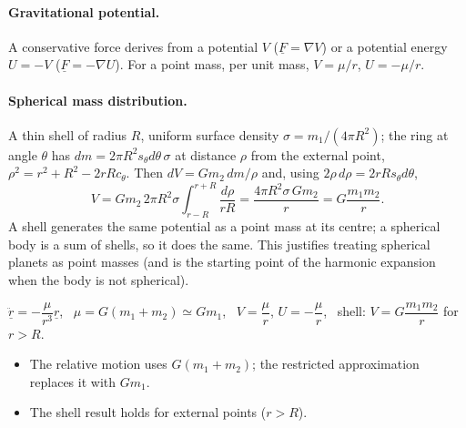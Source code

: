 \paragraph{Gravitational potential.} A conservative force derives from a potential $V$ ($\underline F=\nabla V$) or a potential energy $U=-V$
($\underline F=-\nabla U$). For a point mass, per unit mass, $V=\mu/r$, $U=-\mu/r$.

\paragraph{Spherical mass distribution.} A thin shell of radius $R$, uniform surface density $\sigma=m_1/(4\pi R^2)$; the ring at angle $\theta$
has $dm=2\pi R^2s_\theta d\theta\,\sigma$ at distance $\rho$ from the external point, $\rho^2=r^2+R^2-2rRc_\theta$. Then
$dV=Gm_2\,dm/\rho$ and, using $2\rho\,d\rho=2rRs_\theta d\theta$,
\begin{equation}
V=Gm_2\,2\pi R^2\sigma\int_{r-R}^{r+R}\frac{d\rho}{rR}=\frac{4\pi R^2\sigma\,Gm_2}{r}=G\frac{m_1m_2}{r}.
\end{equation}
A shell generates the same potential as a point mass at its centre; a spherical body is a sum of shells, so it does the same. This
justifies treating spherical planets as point masses (and is the starting point of the harmonic expansion when the body is not spherical).

\begin{keyf}
$\ddot{\underline r}=-\dfrac{\mu}{r^3}\underline r$, \ $\mu=G(m_1+m_2)\simeq Gm_1$, \ $V=\dfrac{\mu}{r}$, $U=-\dfrac{\mu}{r}$, \ shell: $V=G\dfrac{m_1m_2}{r}$ for $r>R$.
\end{keyf}
\pitfalls
\begin{itemize}
\item The relative motion uses $G(m_1+m_2)$; the restricted approximation replaces it with $Gm_1$.
\item The shell result holds for external points ($r>R$).
\end{itemize}

